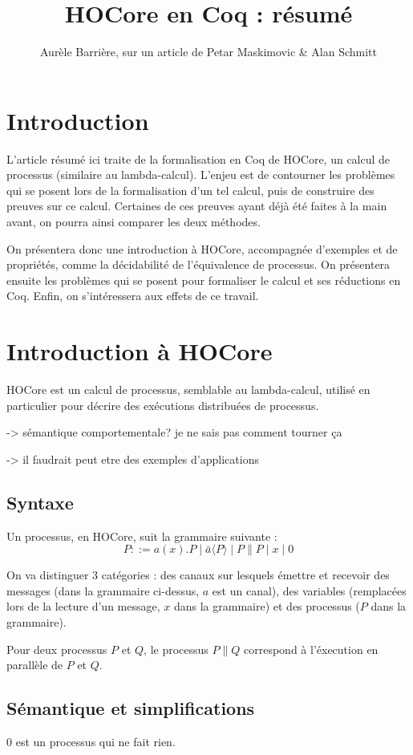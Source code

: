 \documentclass[11pt]{article}
\title{HOCore en Coq : résumé}
\author{Aurèle Barrière, sur un article de Petar Maskimovic \& Alan Schmitt}
\begin{document}
\nocite{*}
\maketitle


\section{Introduction}
L'article résumé ici traite de la formalisation en Coq de HOCore, un calcul de processus (similaire au lambda-calcul). L'enjeu est de contourner les problèmes qui se posent lors de la formalisation d'un tel calcul, puis de construire des preuves sur ce calcul. Certaines de ces preuves ayant déjà été faites à la main avant, on pourra ainsi comparer les deux méthodes.

On présentera donc une introduction à HOCore, accompagnée d'exemples et de propriétés, comme la décidabilité de l'équivalence de processus.
On présentera ensuite les problèmes qui se posent pour formaliser le calcul et ses réductions en Coq.
Enfin, on s'intéressera aux effets de ce travail.

\section{Introduction à HOCore}
HOCore est un calcul de processus, semblable au lambda-calcul, utilisé en particulier pour décrire des exécutions distribuées de processus.

-> sémantique comportementale? je ne sais pas comment tourner ça

-> il faudrait peut etre des exemples d'applications


\subsection{Syntaxe}
Un processus, en HOCore, suit la grammaire suivante :
$$ P ::= a(x).P \mid \bar{a}\langle P\rangle \mid P\|P \mid x \mid 0 $$

On va distinguer 3 catégories : des canaux sur lesquels émettre et recevoir des messages (dans la grammaire ci-dessus, $a$ est un canal), des variables (remplacées lors de la lecture d'un message, $x$ dans la grammaire) et des processus ($P$ dans la grammaire).

Pour deux processus $P$ et $Q$, le processus $P\|Q$ correspond à l'éxecution en parallèle de $P$ et $Q$.


\subsection{Sémantique et simplifications}
$0$ est un processus qui ne fait rien.
\end{document}
